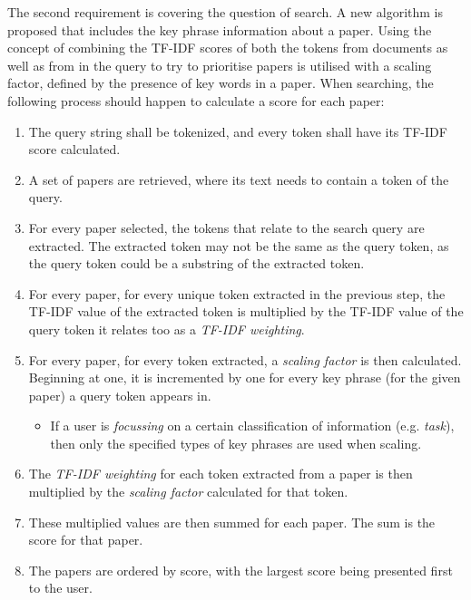 The second requirement is covering the question of search. A new algorithm is proposed that includes the key phrase information about a paper. Using the concept of combining the TF-IDF scores of both the tokens from documents as well as from in the query to try to prioritise papers is utilised with a scaling factor, defined by the presence of key words in a paper. When searching, the following process should happen to calculate a score for each paper:
\begin{enumerate}
	\item The query string shall be tokenized, and every token shall have its TF-IDF score calculated.
	\item A set of papers are retrieved, where its text needs to contain a token of the query.
	\item For every paper selected, the tokens that relate to the search query are extracted. The extracted token may not be the same as the query token, as the query token could be a substring of the extracted token.
	\item For every paper, for every unique token extracted in the previous step, the TF-IDF value of the extracted token is multiplied by the TF-IDF value of the query token it relates too as a \textit{TF-IDF weighting}. 
	\item For every paper, for every token extracted, a \textit{scaling factor} is then calculated. Beginning at one, it is incremented by one for every key phrase (for the given paper) a query token appears in.
	\begin{itemize}
		\item If a user is \textit{focussing} on a certain classification of information (e.g. \textit{task}), then only the specified types of key phrases are used when scaling.
	\end{itemize}
	\item The \textit{TF-IDF weighting} for each token extracted from a paper is then multiplied by the \textit{scaling factor} calculated for that token.
	\item These multiplied values are then summed for each paper. The sum is the score for that paper.
	\item The papers are ordered by score, with the largest score being presented first to the user.
\end{enumerate}

